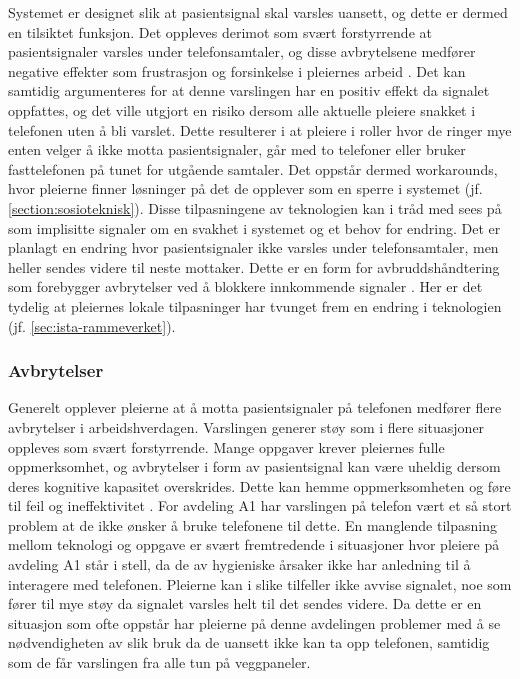 \noindent
Systemet er designet slik at pasientsignal skal varsles uansett, og dette er dermed en tilsiktet funksjon. Det oppleves derimot som svært forstyrrende at pasientsignaler varsles under telefonsamtaler, og disse avbrytelsene medfører negative effekter som frustrasjon og forsinkelse i pleiernes arbeid \citep{Grundgeiger09}. Det kan samtidig argumenteres for at denne varslingen har en positiv effekt da signalet oppfattes, og det ville utgjort en risiko dersom alle aktuelle pleiere snakket i telefonen uten å bli varslet. Dette resulterer i at pleiere i roller hvor de ringer mye enten velger å ikke motta pasientsignaler, går med to telefoner eller bruker fasttelefonen på tunet for utgående samtaler. Det oppstår dermed workarounds, hvor pleierne finner løsninger på det de opplever som en sperre i systemet (jf. \ref{section:sosioteknisk}). Disse tilpasningene av teknologien kan i tråd med \citet{Coiera07} sees på som implisitte signaler om en svakhet i systemet og et behov for endring. Det er planlagt en endring hvor pasientsignaler ikke varsles under telefonsamtaler, men heller sendes videre til neste mottaker. Dette er en form for avbruddshåndtering som forebygger avbrytelser ved å blokkere innkommende signaler \citep{Grandhi10}. Her er det tydelig at pleiernes lokale tilpasninger har tvunget frem en endring i teknologien (jf. \ref{sec:ista-rammeverket}).
	
\subsubsection{Avbrytelser}
Generelt opplever pleierne at å motta pasientsignaler på telefonen medfører flere avbrytelser i arbeidshverdagen. Varslingen generer støy som i flere situasjoner oppleves som svært forstyrrende. Mange oppgaver krever pleiernes fulle oppmerksomhet, og avbrytelser i form av pasientsignal kan være uheldig dersom deres kognitive kapasitet overskrides. Dette kan hemme oppmerksomheten og føre til feil og ineffektivitet \citep{Ebright10, Parker00}. For avdeling A1 har varslingen på telefon vært et så stort problem at de ikke ønsker å bruke telefonene til dette. En manglende tilpasning mellom teknologi og oppgave er svært fremtredende i situasjoner hvor pleiere på avdeling A1 står i stell, da de av hygieniske årsaker ikke har anledning til å interagere med telefonen. Pleierne kan i slike tilfeller ikke avvise signalet, noe som fører til mye støy da signalet varsles helt til det sendes videre. Da dette er en situasjon som ofte oppstår har pleierne på denne avdelingen problemer med å se nødvendigheten av slik bruk da de uansett ikke kan ta opp telefonen, samtidig som de får varslingen fra alle tun på veggpaneler.

